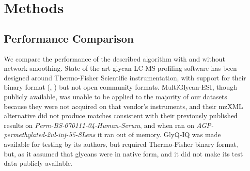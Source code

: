 \section{Methods}











\subsection{Performance Comparison}
    We compare the performance of the described algorithm with and without
    network smoothing. State of the art glycan LC-MS profiling software
    has been designed around Thermo-Fisher Scientific instrumentation, with
    support for their binary format (\cite{Kronewitter2014}, \cite{Yu2013})
    but not open community formats. MultiGlycan-ESI, though publicly available,
    was unable to be applied to the majority of our datasets because they were
    not acquired on that vendor's instruments, and their mzXML alternative
    did not produce matches consistent with their previously published results
    on \textit{Perm-BS-070111-04-Human-Serum}, and when ran on
    \textit{AGP-permethylated-2ul-inj-55-SLens} it ran out of memory. GlyQ-IQ
    was made available for testing by its authors, but required Thermo-Fisher
    binary format, but, as it assumed that glycans were in native form, and it
    did not make its test data publicly available.
